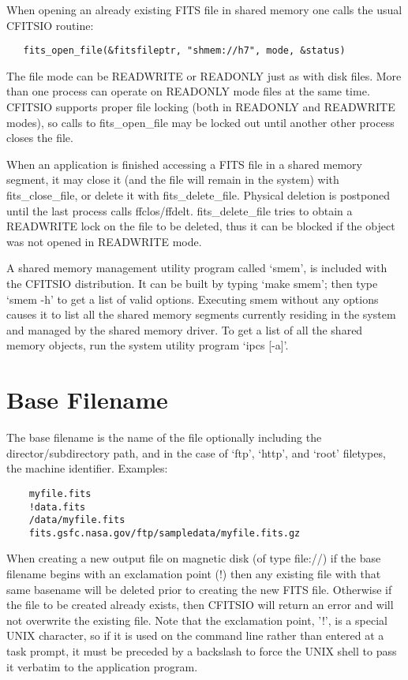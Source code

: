 \documentclass[11pt]{book}
\begin{document}
When opening an already existing FITS file in shared memory one calls
the usual CFITSIO routine:

\begin{verbatim}
   fits_open_file(&fitsfileptr, "shmem://h7", mode, &status)
\end{verbatim}
The file mode can be READWRITE or READONLY just as with disk files.
More than one process can operate on READONLY mode files at the same
time.  CFITSIO supports proper file locking (both in READONLY and
READWRITE modes), so calls to fits\_open\_file may be locked out until
another other process closes the file.

When an application is finished accessing a FITS file in a shared
memory segment, it may close it  (and the file will remain in the
system) with fits\_close\_file, or delete it with fits\_delete\_file.
Physical deletion is postponed until the last process calls
ffclos/ffdelt.  fits\_delete\_file tries to obtain a READWRITE lock on
the file to be deleted, thus it can be blocked if the object was not
opened in READWRITE mode.

A shared memory management utility program called `smem', is included
with the CFITSIO distribution.  It can be built by typing `make smem';
then type `smem -h' to get a list of valid options.  Executing smem
without any options causes it to list all the shared memory segments
currently residing in the system and managed by the shared memory
driver. To get a list of all the shared memory objects, run the system
utility program `ipcs  [-a]'.


\section{Base Filename}

The base filename is the name of the file optionally including the
director/subdirectory path, and in the case of `ftp', `http', and `root'
filetypes, the machine identifier.  Examples:

\begin{verbatim}
    myfile.fits
    !data.fits
    /data/myfile.fits
    fits.gsfc.nasa.gov/ftp/sampledata/myfile.fits.gz
\end{verbatim}

When creating a new output file on magnetic disk (of type file://) if
the base filename begins with an exclamation point (!) then any
existing file with that same basename will be deleted prior to creating
the new FITS file.  Otherwise if the file to be created already exists,
then CFITSIO will return an error and will not overwrite the existing
file.  Note  that the exclamation point,  '!', is a special UNIX character,
so if it is used  on the command line rather than entered at a task
prompt, it must be  preceded by a backslash to force the UNIX
shell to pass it verbatim to the application program.
\end{document}
